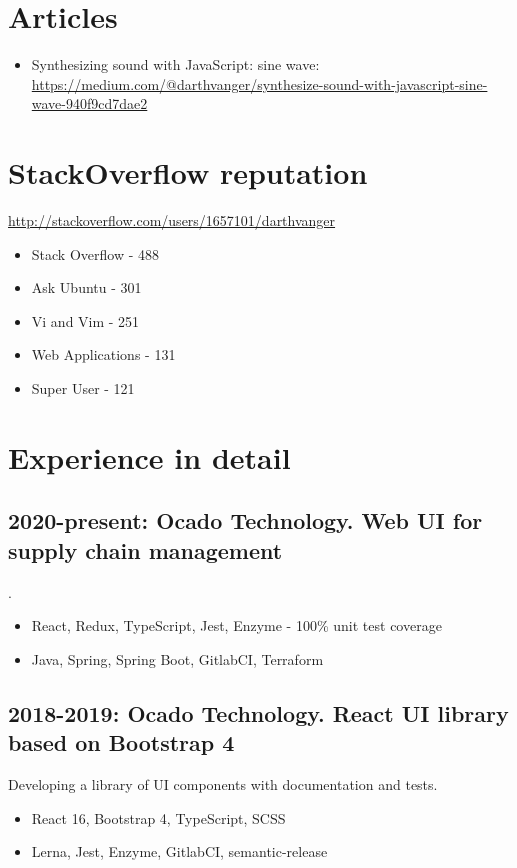 \documentclass[a4paper, 14pt]{article}
\begin{document}
\section{Articles}
  \begin{itemize}
    \item Synthesizing sound with JavaScript: sine wave: \url{https://medium.com/@darthvanger/synthesize-sound-with-javascript-sine-wave-940f9cd7dae2}
  \end{itemize}

\section{StackOverflow reputation}
  \url{http://stackoverflow.com/users/1657101/darthvanger} \\
  \begin{itemize}
    \item Stack Overflow - 488 \\
    \item Ask Ubuntu - 301 \\
    \item Vi and Vim - 251 \\
    \item Web Applications - 131 \\
    \item Super User - 121 \\
  \end{itemize}

\section{Experience in detail}
  \subsection{2020-present: Ocado Technology. Web UI for supply chain management}.
    \begin{itemize}
      \item React, Redux, TypeScript, Jest, Enzyme - 100\% unit test coverage \\
      \item Java, Spring, Spring Boot, GitlabCI, Terraform
    \end{itemize}
  \subsection{2018-2019: Ocado Technology. React UI library based on Bootstrap 4}
    Developing a library of UI components with documentation and tests.
    \begin{itemize}
      \item React 16, Bootstrap 4, TypeScript, SCSS \\ 
      \item Lerna, Jest, Enzyme, GitlabCI, semantic-release
    \end{itemize}
\end{document}
